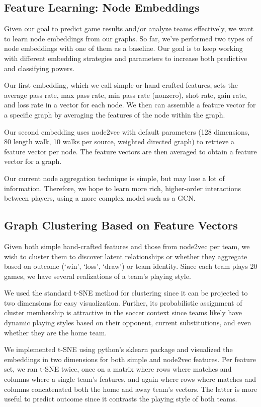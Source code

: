 \subsection{Feature Learning: Node Embeddings}
Given our goal to predict game results and/or analyze teams effectively, we want to learn node embeddings from our graphs. So far, we've performed two types of node embeddings with one of them as a baseline. Our goal is to keep working with different embedding strategies and parameters to increase both predictive and classifying powers. 

Our first embedding, which we call simple or hand-crafted features, sets the average pass rate, max pass rate, min pass rate (nonzero), shot rate, gain rate, and loss rate in a vector for each node. We then can assemble a feature vector for a specific graph by averaging the features of the node within the graph. 

Our second embedding uses node2vec with default parameters (128 dimensions, 80 length walk, 10 walks per source, weighted directed graph) to retrieve a feature vector per node. The feature vectors are then averaged to obtain a feature vector for a graph. 

Our current node aggregation technique is simple, but may lose a lot of information. 
Therefore, we hope to learn more rich, higher-order interactions between players, using a more complex model such as a  GCN.

\subsection{Graph Clustering Based on Feature Vectors}
Given both simple hand-crafted features and those from node2vec per team, we wish to cluster them to discover latent relationships or whether they aggregate based on outcome (`win', `loss', `draw') or team identity. Since each team plays 20 games, we have several realizations of a team's playing style.

We used the standard t-SNE method for clustering since it can be projected to two dimensions for easy visualization. Further, its probabilistic assignment of cluster membership is attractive in the soccer context since teams likely have dynamic playing styles based on their opponent, current substitutions, and even whether they are the home team.

We implemented t-SNE using python's  sklearn package and visualized the embeddings in two dimensions for both simple and node2vec features. Per feature set, we ran t-SNE twice, once on a matrix where rows where matches and columns where a single team's features, and again where rows where matches and columns concatenated both the home and away team's vectors. The latter is more useful to predict outcome since it contrasts the playing style of both teams.

